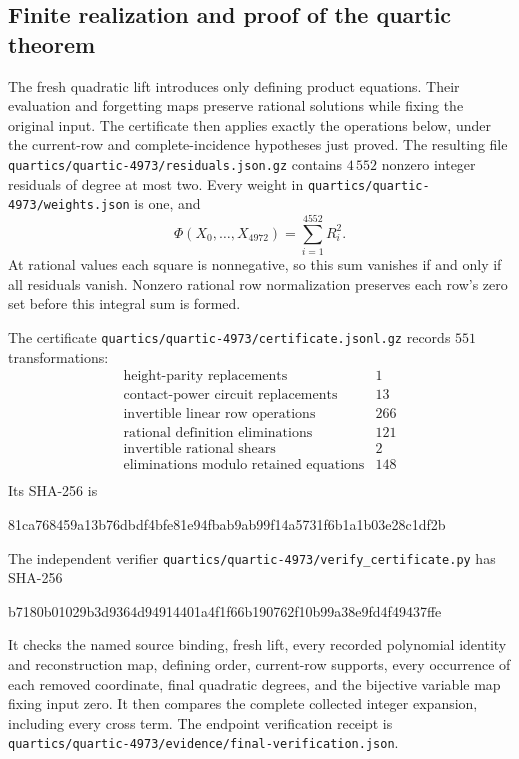 \documentclass[11pt]{article}
\theoremstyle{definition}
\theoremstyle{remark}
\begin{document}
\subsection{Finite realization and proof of the quartic theorem}
The fresh quadratic lift introduces only defining product equations.
Their evaluation and forgetting maps preserve rational solutions while
fixing the original input. The certificate then applies exactly the
operations below, under the current-row and complete-incidence hypotheses
just proved. The resulting file \nolinkurl{quartics/quartic-4973/residuals.json.gz}
contains $4\,552$ nonzero integer residuals of degree at most two.
Every weight in \nolinkurl{quartics/quartic-4973/weights.json} is one, and
\[
 \Phi(X_0,\ldots,X_{4972})=\sum_{i=1}^{4552}R_i^2.
\]
At rational values each square is nonnegative, so this sum vanishes if and
only if all residuals vanish. Nonzero rational row normalization preserves
each row's zero set before this integral sum is formed.

The certificate \nolinkurl{quartics/quartic-4973/certificate.jsonl.gz} records $551$ transformations:
\[
\begin{array}{lr}
\text{height-parity replacements}&1\\
\text{contact-power circuit replacements}&13\\
\text{invertible linear row operations}&266\\
\text{rational definition eliminations}&121\\
\text{invertible rational shears}&2\\
\text{eliminations modulo retained equations}&148\\
\end{array}
\]
Its SHA-256 is
\begin{center}\footnotesize\ttfamily
81ca768459a13b76dbdf4bfe81e94fbab9ab99f14a5731f6b1a1b03e28c1df2b
\end{center}
The independent verifier \nolinkurl{quartics/quartic-4973/verify_certificate.py} has SHA-256
\begin{center}\footnotesize\ttfamily
b7180b01029b3d9364d94914401a4f1f66b190762f10b99a38e9fd4f49437ffe
\end{center}
It checks the named source binding, fresh lift, every recorded
polynomial identity and reconstruction map, defining order, current-row
supports, every occurrence of each removed coordinate, final quadratic
degrees, and the bijective variable map fixing input zero. It then compares
the complete collected integer expansion, including every cross term.
The endpoint verification receipt is \nolinkurl{quartics/quartic-4973/evidence/final-verification.json}.
\end{document}

